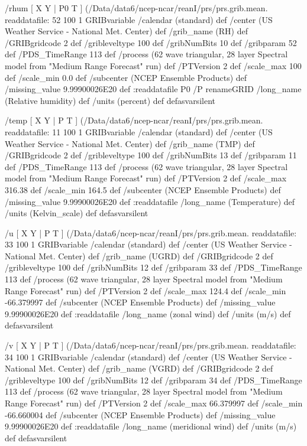 \begin{ingrid}
  /rhum { [ X Y | P0 T ] (/Data/data6/ncep-ncar/reanI/prs/prs.grib.mean.%
  readdatafile:
  52 100 1 GRIBvariable
  /calendar (standard) def
  /center (US Weather Service - National Met. Center) def
  /grib_name (RH) def
  /GRIBgridcode 2 def
  /gribleveltype 100 def
  /gribNumBits 10 def
  /gribparam 52 def
  /PDS_TimeRange 113 def
  /process (62 wave triangular, 28 layer Spectral model from "Medium Range Forecast" run) def
  /PTVersion 2 def
  /scale_max 100 def
  /scale_min 0.0 def
  /subcenter (NCEP Ensemble Products) def
  /missing_value 9.99900026E20 def
  :readdatafile
  P0 /P renameGRID
  /long_name (Relative humidity) def
  /units (percent) def
  } defasvarsilent

  /temp { [ X Y | P T ] (/Data/data6/ncep-ncar/reanI/prs/prs.grib.mean.%
  readdatafile:
  11 100 1 GRIBvariable
  /calendar (standard) def
  /center (US Weather Service - National Met. Center) def
  /grib_name (TMP) def
  /GRIBgridcode 2 def
  /gribleveltype 100 def
  /gribNumBits 13 def
  /gribparam 11 def
  /PDS_TimeRange 113 def
  /process (62 wave triangular, 28 layer Spectral model from "Medium Range Forecast" run) def
  /PTVersion 2 def
  /scale_max 316.38 def
  /scale_min 164.5 def
  /subcenter (NCEP Ensemble Products) def
  /missing_value 9.99900026E20 def
  :readdatafile
  /long_name (Temperature) def
  /units (Kelvin_scale) def
  } defasvarsilent

  /u { [ X Y | P T ] (/Data/data6/ncep-ncar/reanI/prs/prs.grib.mean.%
  readdatafile:
  33 100 1 GRIBvariable
  /calendar (standard) def
  /center (US Weather Service - National Met. Center) def
  /grib_name (UGRD) def
  /GRIBgridcode 2 def
  /gribleveltype 100 def
  /gribNumBits 12 def
  /gribparam 33 def
  /PDS_TimeRange 113 def
  /process (62 wave triangular, 28 layer Spectral model from "Medium Range Forecast" run) def
  /PTVersion 2 def
  /scale_max 124.4 def
  /scale_min -66.379997 def
  /subcenter (NCEP Ensemble Products) def
  /missing_value 9.99900026E20 def
  :readdatafile
  /long_name (zonal wind) def
  /units (m/s) def
  } defasvarsilent

  /v { [ X Y | P T ] (/Data/data6/ncep-ncar/reanI/prs/prs.grib.mean.%
  readdatafile:
  34 100 1 GRIBvariable
  /calendar (standard) def
  /center (US Weather Service - National Met. Center) def
  /grib_name (VGRD) def
  /GRIBgridcode 2 def
  /gribleveltype 100 def
  /gribNumBits 12 def
  /gribparam 34 def
  /PDS_TimeRange 113 def
  /process (62 wave triangular, 28 layer Spectral model from "Medium Range Forecast" run) def
  /PTVersion 2 def
  /scale_max 66.379997 def
  /scale_min -66.660004 def
  /subcenter (NCEP Ensemble Products) def
  /missing_value 9.99900026E20 def
  :readdatafile
  /long_name (meridional wind) def
  /units (m/s) def
  } defasvarsilent


\end{ingrid}
